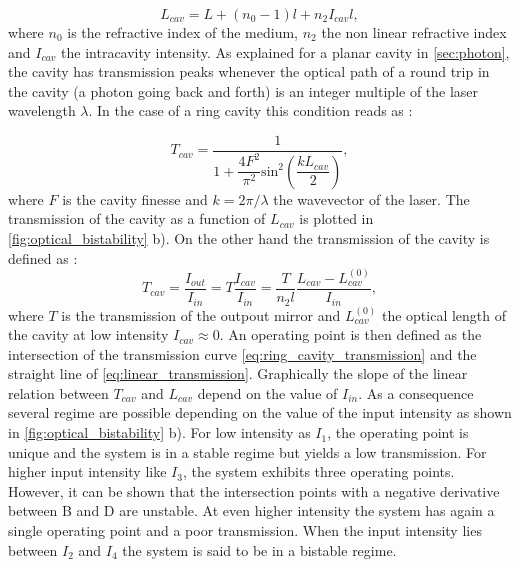 \begin{equation}
    L_{cav}= L+(n_0-1)l+n_2I_{cav}l,
    \label{eq:optical_length}
\end{equation}
where $n_0$ is the refractive index of the medium, $n_2$ the non linear refractive index and $I_{cav}$ the intracavity intensity.
As explained for a planar cavity in \autoref{sec:photon}, the cavity has transmission peaks whenever the optical path of a round trip in the cavity (a photon going back and forth) is an integer multiple of the laser wavelength $\lambda$.
In the case of a ring cavity this condition reads as :

\begin{equation}
    T_{cav} = \dfrac{1}{1+\dfrac{4F^2}{\pi^2}\mathrm{sin}^2\left(\dfrac{kL_{cav}}{2}\right)},
    \label{eq:ring_cavity_transmission}
\end{equation}
where $F$ is the cavity finesse and $k=2\pi/\lambda$ the wavevector of the laser. The transmission of the cavity as a function of $L_{cav}$ is plotted in \autoref{fig:optical_bistability} b). 
On the other hand the transmission of the cavity is defined as :
\begin{equation}
    T_{cav} = \dfrac{I_{out}}{I_{in}}= T\dfrac{I_{cav}}{I_{in}}= \dfrac{T}{n_2l}\dfrac{L_{cav}-L^{(0)}_{cav}}{I_{in}},
    \label{eq:linear_transmission}
\end{equation}
where $T$ is the transmission of the outpout mirror and $L_{cav}^{(0)}$ the optical length of the cavity at low intensity $I_{cav}\approx 0$. An operating point is then defined as the intersection of the transmission curve \autoref{eq:ring_cavity_transmission} and the straight line of \autoref{eq:linear_transmission}. Graphically the slope 
of the linear relation between $T_{cav}$ and $L_{cav}$ depend on the value of $I_{in}$.
As a consequence several regime are possible depending on the value of the input intensity as shown in \autoref{fig:optical_bistability} b). For low intensity as $I_1$, the operating point is unique and the system is in a stable regime but yields a low transmission. For higher input intensity like $I_3$, the system exhibits three operating points. However, it can be shown that the intersection points with a negative derivative between B and D are unstable. At even higher 
intensity the system has again a single operating point and a poor transmission. When the input intensity lies between $I_2$ and $I_4$ the system is said to be in a bistable regime. 

\bigskip 

